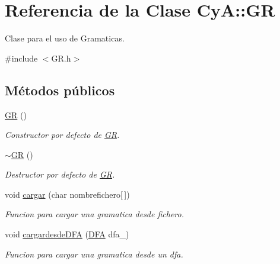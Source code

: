 \hypertarget{class_cy_a_1_1_g_r}{}\section{Referencia de la Clase CyA\+:\+:GR}
\label{class_cy_a_1_1_g_r}


Clase para el uso de Gramaticas.  




{\ttfamily \#include $<$G\+R.\+h$>$}

\subsection*{Métodos públicos}
\begin{DoxyCompactItemize}
\item 
\mbox{\label{class_cy_a_1_1_g_r_a9ff6c13befbda8a5f82ae9e30e976a2b}} 
\mbox{\hyperlink{class_cy_a_1_1_g_r_a9ff6c13befbda8a5f82ae9e30e976a2b}{GR}} ()
\begin{DoxyCompactList}\small\item\em Constructor por defecto de \mbox{\hyperlink{class_cy_a_1_1_g_r}{GR}}. \end{DoxyCompactList}\item 
\mbox{\label{class_cy_a_1_1_g_r_afad22fec67e373f85bce6860fd19e788}} 
\mbox{\hyperlink{class_cy_a_1_1_g_r_afad22fec67e373f85bce6860fd19e788}{$\sim$\+GR}} ()
\begin{DoxyCompactList}\small\item\em Destructor por defecto de \mbox{\hyperlink{class_cy_a_1_1_g_r}{GR}}. \end{DoxyCompactList}\item 
void \mbox{\hyperlink{class_cy_a_1_1_g_r_ae69828146c07258ec79c26fcc85b78f6}{cargar}} (char nombrefichero\mbox{[}$\,$\mbox{]})
\begin{DoxyCompactList}\small\item\em Funcion para cargar una gramatica desde fichero. \end{DoxyCompactList}\item 
void \mbox{\hyperlink{class_cy_a_1_1_g_r_a8d131c8d2a28fb5f949499b46336bab1}{cargardesde\+D\+FA}} (\mbox{\hyperlink{class_cy_a_1_1_d_f_a}{D\+FA}} dfa\+\_\+)
\begin{DoxyCompactList}\small\item\em Funcion para cargar una gramatica desde un dfa. \end{DoxyCompactList}\item 

\end{DoxyCompactItemize}
